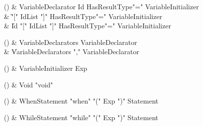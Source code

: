 \begin{bbgrammarappendix}

() & VariableDeclarator \label{prod:VariableDeclarator}  \: Id HasResultType\opt \xcd"=" VariableInitializer  \\

 &    \| \xcd"[" IdList \xcd"]" HasResultType\opt \xcd"=" VariableInitializer \\
 &    \| Id \xcd"[" IdList \xcd"]" HasResultType\opt \xcd"=" VariableInitializer \\

\end{bbgrammarappendix}

\begin{bbgrammarappendix}

() & VariableDeclarators \label{prod:VariableDeclarators}  \: VariableDeclarator  \\

 &    \| VariableDeclarators \xcd"," VariableDeclarator \\

\end{bbgrammarappendix}

\begin{bbgrammarappendix}

() & VariableInitializer \label{prod:VariableInitializer}  \: Exp  \\


\end{bbgrammarappendix}

\begin{bbgrammarappendix}

() & Void \label{prod:Void}  \: \xcd"void"  \\


\end{bbgrammarappendix}

\begin{bbgrammarappendix}

() & WhenStatement \label{prod:WhenStatement}  \: \xcd"when" \xcd"(" Exp \xcd")" Statement  \\


\end{bbgrammarappendix}

\begin{bbgrammarappendix}

() & WhileStatement \label{prod:WhileStatement}  \: \xcd"while" \xcd"(" Exp \xcd")" Statement  \\


\end{bbgrammarappendix}
